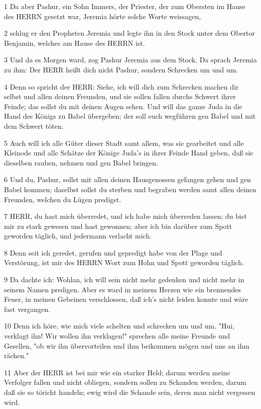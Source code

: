\par 1 Da aber Pashur, ein Sohn Immers, der Priester, der zum Obersten im Hause des HERRN gesetzt war, Jeremia hörte solche Worte weissagen,
\par 2 schlug er den Propheten Jeremia und legte ihn in den Stock unter dem Obertor Benjamin, welches am Hause des HERRN ist.
\par 3 Und da es Morgen ward, zog Pashur Jeremia aus dem Stock. Da sprach Jeremia zu ihm: Der HERR heißt dich nicht Pashur, sondern Schrecken um und um.
\par 4 Denn so spricht der HERR: Siehe, ich will dich zum Schrecken machen dir selbst und allen deinen Freunden, und sie sollen fallen durchs Schwert ihrer Feinde; das sollst du mit deinen Augen sehen. Und will das ganze Juda in die Hand des Königs zu Babel übergeben; der soll euch wegführen gen Babel und mit dem Schwert töten.
\par 5 Auch will ich alle Güter dieser Stadt samt allem, was sie gearbeitet und alle Kleinode und alle Schätze der Könige Juda's in ihrer Feinde Hand geben, daß sie dieselben rauben, nehmen und gen Babel bringen.
\par 6 Und du, Pashur, sollst mit allen deinen Hausgenossen gefangen gehen und gen Babel kommen; daselbst sollst du sterben und begraben werden samt allen deinen Freunden, welchen du Lügen predigst.
\par 7 HERR, du hast mich überredet, und ich habe mich überreden lassen; du bist mir zu stark gewesen und hast gewonnen; aber ich bin darüber zum Spott geworden täglich, und jedermann verlacht mich.
\par 8 Denn seit ich geredet, gerufen und gepredigt habe von der Plage und Verstörung, ist mir des HERRN Wort zum Hohn und Spott geworden täglich.
\par 9 Da dachte ich: Wohlan, ich will sein nicht mehr gedenken und nicht mehr in seinem Namen predigen. Aber es ward in meinem Herzen wie ein brennendes Feuer, in meinen Gebeinen verschlossen, daß ich's nicht leiden konnte und wäre fast vergangen.
\par 10 Denn ich höre, wie mich viele schelten und schrecken um und um. "Hui, verklagt ihn! Wir wollen ihn verklagen!" sprechen alle meine Freunde und Gesellen, "ob wir ihn übervorteilen und ihm beikommen mögen und uns an ihm rächen."
\par 11 Aber der HERR ist bei mir wie ein starker Held; darum werden meine Verfolger fallen und nicht obliegen, sondern sollen zu Schanden werden, darum daß sie so töricht handeln; ewig wird die Schande sein, deren man nicht vergessen wird.
